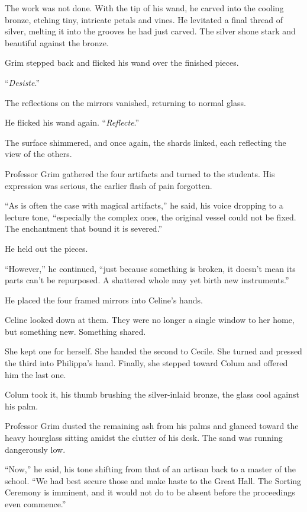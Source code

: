 The work was not done. With the tip of his wand, he carved into the cooling bronze, etching tiny, intricate petals and vines. He levitated a final thread of silver, melting it into the grooves he had just carved. The silver shone stark and beautiful against the bronze.
 
Grim stepped back and flicked his wand over the finished pieces.
 
\enquote{\textit{Desiste}.}
 
The reflections on the mirrors vanished, returning to normal glass.
 
He flicked his wand again. \enquote{\textit{Reflecte}.}
 
The surface shimmered, and once again, the shards linked, each reflecting the view of the others.
 
Professor Grim gathered the four artifacts and turned to the students. His expression was serious, the earlier flash of pain forgotten.
 
\enquote{As is often the case with magical artifacts,} he said, his voice dropping to a lecture tone, \enquote{especially the complex ones, the original vessel could not be fixed. The enchantment that bound it is severed.}
 
He held out the pieces.
 
\enquote{However,} he continued, \enquote{just because something is broken, it doesn't mean its parts can't be repurposed. A shattered whole may yet birth new instruments.}
 
He placed the four framed mirrors into Celine's hands.
 
Celine looked down at them. They were no longer a single window to her home, but something new. Something shared.
 
She kept one for herself. She handed the second to Cecile. She turned and pressed the third into Philippa's hand. Finally, she stepped toward Colum and offered him the last one.

Colum took it, his thumb brushing the silver-inlaid bronze, the glass cool against his palm.
 
Professor Grim dusted the remaining ash from his palms and glanced toward the heavy hourglass sitting amidst the clutter of his desk. The sand was running dangerously low.
 
\enquote{Now,} he said, his tone shifting from that of an artisan back to a master of the school. \enquote{We had best secure those and make haste to the Great Hall. The Sorting Ceremony is imminent, and it would not do to be absent before the proceedings even commence.}
 

